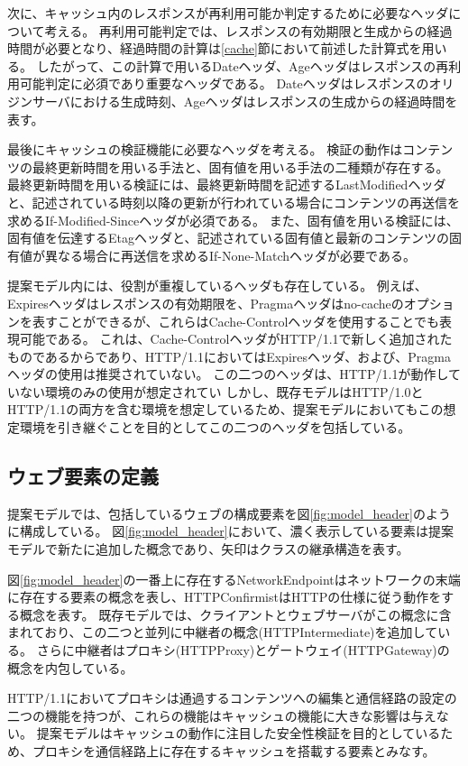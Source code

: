 \documentclass{css}
\begin{document}
次に、キャッシュ内のレスポンスが再利用可能か判定するために必要なヘッダについて考える。
再利用可能判定では、レスポンスの有効期限と生成からの経過時間が必要となり、経過時間の計算は\ref{cache}節において前述した計算式を用いる。
したがって、この計算で用いるDateヘッダ、Ageヘッダはレスポンスの再利用可能判定に必須であり重要なヘッダである。
Dateヘッダはレスポンスのオリジンサーバにおける生成時刻、Ageヘッダはレスポンスの生成からの経過時間を表す。

最後にキャッシュの検証機能に必要なヘッダを考える。
検証の動作はコンテンツの最終更新時間を用いる手法と、固有値を用いる手法の二種類が存在する。
最終更新時間を用いる検証には、最終更新時間を記述するLastModifiedヘッダと、記述されている時刻以降の更新が行われている場合にコンテンツの再送信を求めるIf-Modified-Sinceヘッダが必須である。
また、固有値を用いる検証には、固有値を伝達するEtagヘッダと、記述されている固有値と最新のコンテンツの固有値が異なる場合に再送信を求めるIf-None-Matchヘッダが必要である。

提案モデル内には、役割が重複しているヘッダも存在している。
例えば、Expiresヘッダはレスポンスの有効期限を、Pragmaヘッダはno-cacheのオプションを表すことができるが、これらはCache-Controlヘッダを使用することでも表現可能である。
これは、Cache-ControlヘッダがHTTP/1.1で新しく追加されたものであるからであり、HTTP/1.1においてはExpiresヘッダ、および、Pragmaヘッダの使用は推奨されていない。
この二つのヘッダは、HTTP/1.1が動作していない環境のみの使用が想定されてい
しかし、既存モデルはHTTP/1.0とHTTP/1.1の両方を含む環境を想定しているため、提案モデルにおいてもこの想定環境を引き継ぐことを目的としてこの二つのヘッダを包括している。

\subsection{ウェブ要素の定義}
提案モデルでは、包括しているウェブの構成要素を図\ref{fig:model_header}のように構成している。
図\ref{fig:model_header}において、濃く表示している要素は提案モデルで新たに追加した概念であり、矢印はクラスの継承構造を表す。

図\ref{fig:model_header}の一番上に存在するNetworkEndpointはネットワークの末端に存在する要素の概念を表し、HTTPConfirmistはHTTPの仕様に従う動作をする概念を表す。
既存モデルでは、クライアントとウェブサーバがこの概念に含まれており、この二つと並列に中継者の概念(HTTPIntermediate)を追加している。
さらに中継者はプロキシ(HTTPProxy)とゲートウェイ(HTTPGateway)の概念を内包している。

HTTP/1.1においてプロキシは通過するコンテンツへの編集と通信経路の設定の二つの機能を持つが、これらの機能はキャッシュの機能に大きな影響は与えない。
提案モデルはキャッシュの動作に注目した安全性検証を目的としているため、プロキシを通信経路上に存在するキャッシュを搭載する要素とみなす。
\end{document}
